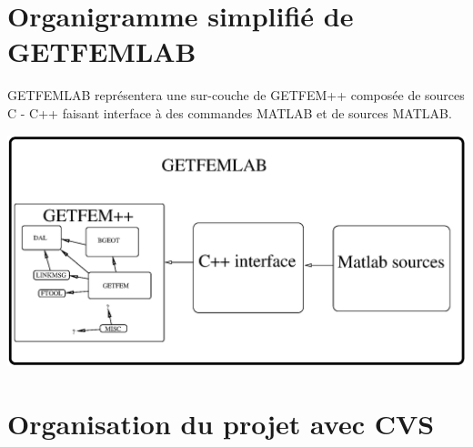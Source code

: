 \documentclass[12pt,a4paper]{../doc}
\begin{document}
{\section{Organigramme simplifi\'e de GETFEMLAB}
GETFEMLAB repr\'esentera une sur-couche de GETFEM++ compos\'ee de sources C - C++ faisant interface \`a des commandes MATLAB et de sources MATLAB.

\begin{center}
\includegraphics[width=17cm,angle=0]{getfemlab_orga.eps}
\end{center}

\section{Organisation du projet avec CVS}

}
\end{document}
